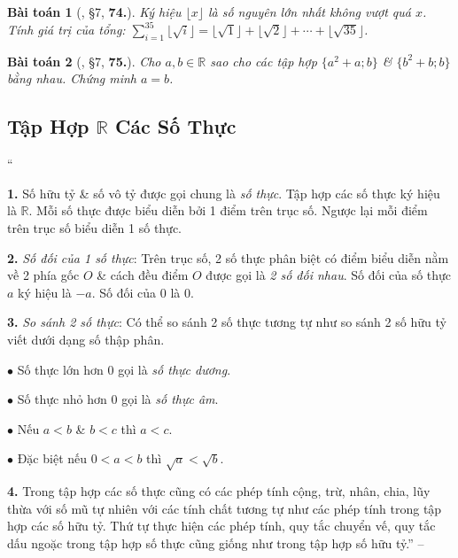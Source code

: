 \documentclass{article}
\numberwithin{equation}{section}
\newtheorem{baitoan}{Bài toán}
\begin{document}
\begin{baitoan}[\cite{Binh_Toan_7_tap_1}, \S7, \textbf{74.}]
	Ký hiệu $\lfloor x\rfloor$ là số nguyên lớn nhất không vượt quá $x$. Tính giá trị của tổng: $\sum_{i=1}^{35} \lfloor\sqrt{i}\rfloor = \lfloor\sqrt{1}\rfloor + \lfloor\sqrt{2}\rfloor + \cdots + \lfloor\sqrt{35}\rfloor$.
\end{baitoan}

\begin{baitoan}[\cite{Binh_Toan_7_tap_1}, \S7, \textbf{75.}]
	Cho $a,b\in\mathbb{R}$ sao cho các tập hợp $\{a^2 + a;b\}$ \& $\{b^2 + b;b\}$ bằng nhau. Chứng minh $a = b$.
\end{baitoan}


\subsection{Tập Hợp $\mathbb{R}$ Các Số Thực}
``\begin{enumerate*}
	\item[\textbf{1.}] Số hữu tỷ \& số vô tỷ được gọi chung là \textit{số thực}. Tập hợp các số thực ký hiệu là $\mathbb{R}$. Mỗi số thực được biểu diễn bởi 1 điểm trên trục số. Ngược lại mỗi điểm trên trục số biểu diễn 1 số thực.
	\item[\textbf{2.}] \textit{Số đối của 1 số thực}: Trên trục số, 2 số thực phân biệt có điểm biểu diễn nằm về 2 phía gốc $O$ \& cách đều điểm $O$ được gọi là \textit{2 số đối nhau}. Số đối của số thực $a$ ký hiệu là $-a$. Số đối của $0$ là $0$.
	\item[\textbf{3.}] \textit{So sánh 2 số thực}: Có thể so sánh 2 số thực tương tự như so sánh 2 số hữu tỷ viết dưới dạng số thập phân.
	\begin{enumerate*}
		\item[$\bullet$] Số thực lớn hơn $0$ gọi là \textit{số thực dương}.
		\item[$\bullet$] Số thực nhỏ hơn $0$ gọi là \textit{số thực âm}.
		\item[$\bullet$] Nếu $a < b$ \& $b < c$ thì $a < c$.
		\item[$\bullet$] Đặc biệt nếu $0 < a < b$ thì $\sqrt{a} < \sqrt{b}$.
	\end{enumerate*}
	\item[\textbf{4.}] Trong tập hợp các số thực cũng có các phép tính cộng, trừ, nhân, chia, lũy thừa với số mũ tự nhiên với các tính chất tương tự như các phép tính trong tập hợp các số hữu tỷ. Thứ tự thực hiện các phép tính, quy tắc chuyển vế, quy tắc dấu ngoặc trong tập hợp số thực cũng giống như trong tập hợp số hữu tỷ.'' -- \cite[Chap. 2, \S2, p. 20]{Tuyen_Toan_7}
\end{enumerate*}
\end{document}
